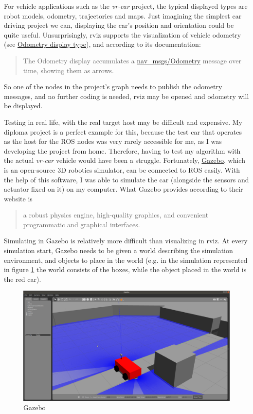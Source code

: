 For vehicle applications such as the \textit{vr-car} project, the typical displayed types are robot models, odometry, trajectories and maps. Just imagining the simplest car driving project we can, displaying the car's position and orientation could be quite useful. Unsurprisingly, rviz supports the visualization of vehicle odometry (see \href{http://wiki.ros.org/rviz/DisplayTypes/Odometry}{Odometry display type}), and according to its documentation:

\begin{quote}
	The Odometry display accumulates a \href{http://docs.ros.org/api/nav_msgs/html/msg/Odometry.html}{nav\_msgs/Odometry} message over time, showing them as arrows.
\end{quote}

So one of the nodes in the project's graph needs to publish the odometry messages, and no further coding is needed, rviz may be opened and odometry will be displayed.

Testing in real life, with the real target host may be difficult and expensive. My diploma project is a perfect example for this, because the test car that operates as the host for the ROS nodes was very rarely accessible for me, as I was developing the project from home. Therefore, having to test my algorithm with the actual \textit{vr-car} vehicle would have been a struggle. Fortunately, \href{http://gazebosim.org/}{Gazebo}, which is an open-source 3D robotics simulator, can be connected to ROS easily. With the help of this software, I was able to simulate the car (alongside the sensors and actuator fixed on it) on my computer. What Gazebo provides according to their website is

\begin{quote}
a robust physics engine, high-quality graphics, and convenient programmatic and graphical interfaces.
\end{quote}

Simulating in Gazebo is relatively more difficult than visualizing in rviz. At every simulation start, Gazebo needs to be given a world describing the simulation environment, and objects to place in the world (e.g. in the simulation represented in figure \ref{gazebo} the world consists of the boxes, while the object placed in the world is the red car).

\begin{figure}[!ht]
	\centering
	\includegraphics[width=\textwidth]{figures/raw/gazebo.png}
	\caption{Gazebo}
	\label{gazebo}
\end{figure}

